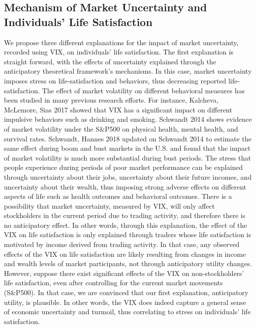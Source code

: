 \documentclass[11pt,a4paper,oldfontcommands]{memoir}
\begin{document}
{\subsection{Mechanism of Market Uncertainty and Individuals' Life Satisfaction}

We propose three different explanations for the impact of market uncertainty, recorded using VIX, on individuals' life satisfaction. The first explanation is straight forward, with the effects of uncertainty explained through the anticipatory theoretical framework's mechanisms. In this case, market uncertainty imposes stress on life-satisfaction and behaviors, thus decreasing reported life-satisfaction. The effect of market volatility on different behavioral measures has been studied in many previous research efforts. For instance, Kalcheva, McLemore, Sias 2017 showed that VIX has a significant impact on different impulsive behaviors such as drinking and smoking. Schwandt 2014 shows evidence of market volatility under the S&P500 on physical health, mental health, and survival rates. Schwandt, Hannes 2018 updated on Schwandt 2014 to estimate the same effect during boom and bust markets in the U.S. and found that the impact of market volatility is much more substantial during bust periods. The stress that people experience during periods of poor market performance can be explained through uncertainty about their jobs, uncertainty about their future incomes, and uncertainty about their wealth, thus imposing strong adverse effects on different aspects of life such as health outcomes and behavioral outcomes. 
There is a possibility that market uncertainty, measured by VIX, will only affect stockholders in the current period due to trading activity, and therefore there is no anticipatory effect. In other words, through this explanation, the effect of the VIX on life satisfaction is only explained through traders whose life satisfaction is motivated by income derived from trading activity. In that case, any observed effects of the VIX on life satisfaction are likely resulting from changes in income and wealth levels of market participants, not through anticipatory utility changes. However, suppose there exist significant effects of the VIX on non-stockholders' life satisfaction, even after controlling for the current market movements (S&P500). In that case, we are convinced that our first explanation, anticipatory utility, is plausible. In other words, the VIX does indeed capture a general sense of economic uncertainty and turmoil, thus correlating to stress on individuals' life satisfaction. 

}
\end{document}
